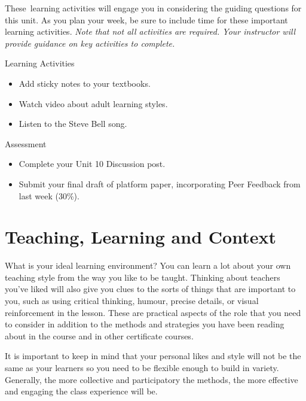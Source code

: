 \documentclass[
]{book}
\providecommand{\tightlist}{%
  \setlength{\itemsep}{0pt}\setlength{\parskip}{0pt}}
\begin{document}
These~learning activities will engage you in considering the guiding questions for this unit. As you plan your week, be sure to include time for these important learning activities. \emph{Note that not all activities are required. Your instructor will provide guidance on key activities to complete.}

\begin{reflect}
{Learning Activities}

\begin{itemize}
\tightlist
\item
  Add sticky notes to your textbooks.\\
\item
  Watch video about adult learning styles.\\
\item
  Listen to the Steve Bell song.
\end{itemize}
\end{reflect}

\begin{assessment}
{Assessment}

\begin{itemize}
\tightlist
\item
  Complete your Unit 10 Discussion post.\\
\item
  Submit your final draft of platform paper, incorporating Peer Feedback from last week (30\%).
\end{itemize}
\end{assessment}

\hypertarget{teaching-learning-and-context}{%
\section{Teaching, Learning and Context}\label{teaching-learning-and-context}}

What is your ideal learning environment? You can learn a lot about your own teaching style from the way you like to be taught. Thinking about teachers you've liked will also give you clues to the sorts of things that are important to you, such as using critical thinking, humour, precise details, or visual reinforcement in the lesson. These are practical aspects of the role that you need to consider in addition to the methods and strategies you have been reading about in the course and in other certificate courses.

It is important to keep in mind that your personal likes and style will not be the same as your learners so you need to be flexible enough to build in variety. Generally, the more collective and participatory the methods, the more effective and engaging the class experience will be.
\end{document}
